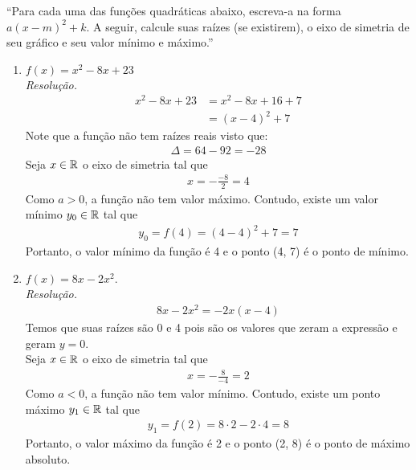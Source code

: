 \enquote{Para cada uma das funções quadráticas abaixo, escreva-a na forma $a(x - m)^2 + k$. A seguir, calcule suas raízes (se existirem), o eixo de simetria de seu gráfico e seu valor mínimo e máximo.}
\begin{enumerate}
    \item $f(x) = x^2 - 8x + 23$ \\
    \emph{Resolução.}
    \begin{align*}
        x^2 - 8x + 23 & = x^2 - 8x + 16 + 7 \\ & =
        (x - 4)^2 + 7
    \end{align*}
    Note que a função não tem raízes reais visto que:
    \begin{align*}
        \Delta = 64 - 92 = -28
    \end{align*}
    Seja $x \in \mathbb R$ o eixo de simetria tal que
    \begin{align*}
        x = -\frac{-8}{2} = 4
    \end{align*}
    Como $a > 0$, a função não tem valor máximo. Contudo, existe um valor mínimo $y_0 \in \mathbb R$ tal que
    \begin{align*}
        y_0 = f(4) = (4 - 4)^2 + 7 = 7
    \end{align*}
    Portanto, o valor mínimo da função é 4 e o ponto (4, 7) é o ponto de mínimo.

    \item $f(x) = 8x - 2x^2$. \\
    \emph{Resolução.}
    \begin{align*}
        8x -2x^2 = -2x(x - 4)
    \end{align*}
    Temos que suas raízes são 0 e 4 pois são os valores que zeram a expressão e geram $y = 0$. \\
    Seja $x \in \mathbb R$ o eixo de simetria tal que
    \begin{align*}
        x = -\frac{8}{-4} = 2
    \end{align*}
    Como $a < 0$, a função não tem valor mínimo. Contudo, existe um ponto máximo $y_1 \in \mathbb R$ tal que
    \begin{align*}
        y_1 = f(2) = 8 \cdot 2 - 2 \cdot 4 = 8
    \end{align*}
    Portanto, o valor máximo da função é 2 e o ponto (2, 8) é o ponto de máximo absoluto.


\end{enumerate}
